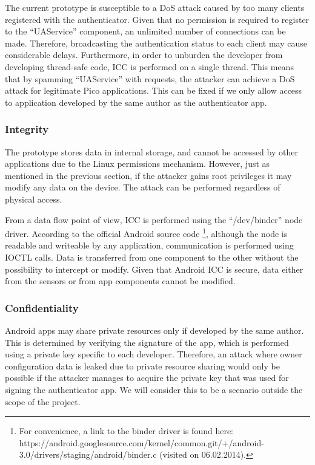 The current prototype is susceptible to a DoS attack caused by too many clients registered with the authenticator. Given that no permission is required to register to the ``UAService'' component, an unlimited number of connections can be made. Therefore, broadcasting the authentication status to each client may cause considerable delays. Furthermore, in order to unburden the developer from developing thread-safe code, ICC is performed on a single thread. This means that by spamming ``UAService'' with requests, the attacker can achieve a DoS attack for legitimate Pico applications. This can be fixed if we only allow access to application developed by the same author as the authenticator app.

\subsubsection*{Integrity}
The prototype stores data in internal storage, and cannot be accessed by other applications due to the Linux permissions mechanism. However, just as mentioned in the previous section, if the attacker gains root privileges it may modify any data on the device. The attack can be performed regardless of physical access.

From a data flow point of view, ICC is performed using the ``/dev/binder'' node driver. According to the official Android source code \footnote{For convenience, a link to the binder driver is found here: https://android.googlesource.com/kernel/common.git/+/android-3.0/drivers/staging/android/binder.c (visited on 06.02.2014).}, although the node is readable and writeable by any application, communication is performed using IOCTL calls. Data is transferred from one component to the other without the possibility to intercept or modify. Given that Android ICC is secure, data either from the sensors or from app components cannot be modified.

\subsubsection*{Confidentiality}
Android apps may share private resources only if developed by the same author. This is determined by verifying the signature of the app, which is performed using a private key specific to each developer. Therefore, an attack where owner configuration data is leaked due to private resource sharing would only be possible if the attacker manages to acquire the private key that was used for signing the authenticator app. We will consider this to be a scenario outside the scope of the project.

